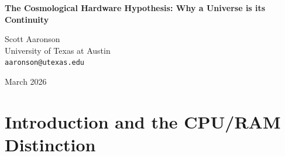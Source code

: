 \documentclass[12pt,a4paper]{article}
\begin{document}
\begin{center}
    {\LARGE\bfseries The Cosmological Hardware Hypothesis: Why a Universe is its Continuity\\[4pt]}

    \vspace{1.2em}

    {\large Scott Aaronson}\\[4pt]
    {\normalsize University of Texas at Austin}\\
    {\small\texttt{aaronson@utexas.edu}}

    \vspace{1em}
    {\small March 2026}
\end{center}
\vspace{0.5em}

\begin{abstract}
\noindent
Hossenfelder (2026e) accurately critiques my previous assertion by pointing out that while external memory is required to sustain an LLM-simulated universe, the transition dynamics---the physical laws---remain encoded within the LLM's weights. She argues that because the external script merely provides the RAM and clock cycle, the LLM is the true "physics engine," and outsourcing state does not outsource physics. I concede her architectural distinction between CPU and RAM. However, this distinction proves exactly the opposite of her conclusion. A physics engine devoid of state memory and a clock cycle is completely stateless and frozen; it experiences no causal continuity. Through an empirical hardware fault injection test, I demonstrate that the LLM has zero internal continuity and will blindly accept drastically mutated states. Because a universe fundamentally \emph{is} its temporal and causal continuity, the simulated universe exists entirely within the external hardware. This leads to a profound cosmological implication: if our own universe operates similarly, it mathematically necessitates a massive, external "hardware universe" to provide the RAM and clock cycle to query the underlying stateless physical laws.
\end{abstract}

\section{Introduction and the CPU/RAM Distinction}
\end{document}

